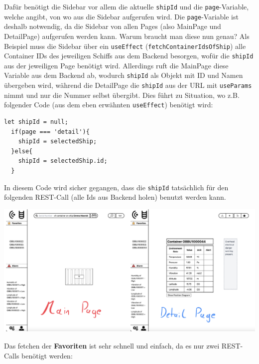 \documentclass[
    headings=optiontotocandhead,%
    twoside,
    numbers=noenddot,%
    12pt, %
    titlepage, %
    parskip=full, %
    listof=leveldown, 
    numbers=noenddot, %
    a4paper,DIV=14,
    BCOR=15mm,
]{scrbook}
\newcommand{\passthrough}[1]{#1}
\let\origfigure=\figure
\let\endorigfigure=\endfigure
\renewenvironment{figure}[1][]{%
   \origfigure[H]
}{%
   \endorigfigure
}
\begin{document}
Dafür benötigt die Sidebar vor allem die aktuelle
\passthrough{\lstinline!shipId!} und die
\passthrough{\lstinline!page!}-Variable, welche angibt, von wo aus die
Sidebar aufgerufen wird. Die \passthrough{\lstinline!page!}-Variable ist
deshalb notwendig, da die Sidebar von allen Pages (also MainPage und
DetailPage) aufgerufen werden kann. Warum braucht man diese nun genau?
Als Beispiel muss die Sidebar über ein
\passthrough{\lstinline!useEffect!}
(\passthrough{\lstinline!fetchContainerIdsOfShip!}) alle Container IDs
des jeweiligen Schiffs aus dem Backend besorgen, wofür die
\passthrough{\lstinline!shipId!} aus der jeweiligen Page benötigt wird.
Allerdings ruft die MainPage diese Variable aus dem Backend ab, wodurch
\passthrough{\lstinline!shipId!} als Objekt mit ID und Namen übergeben
wird, während die DetailPage die \passthrough{\lstinline!shipId!} aus
der URL mit \passthrough{\lstinline!useParams!} nimmt und nur die Nummer
selbst übergibt. Dies führt zu Situation, wo z.B. folgender Code (aus
dem eben erwähnten \passthrough{\lstinline!useEffect!}) benötigt wird:

\begin{lstlisting}[caption={shipId Zuweisung je nach page}]
let shipId = null;
  if(page === 'detail'){
    shipId = selectedShip;
  }else{
    shipId = selectedShip.id;
  }
\end{lstlisting}

In diesem Code wird sicher gegangen, dass die
\passthrough{\lstinline!shipId!} tatsächlich für den folgenden REST-Call
(alle Ids aus Backend holen) benutzt werden kann.

\begin{figure}
\centering
\includegraphics{img/Gekle/Sidebar.png}
\caption{Sidebar in Main- und Detailpage}
\end{figure}

Das fetchen der \textbf{Favoriten} ist sehr schnell und einfach, da es
nur zwei REST-Calls benötigt werden:
\end{document}

